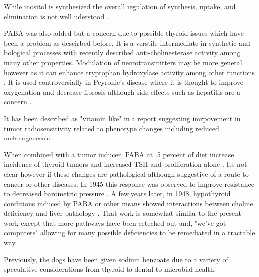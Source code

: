 While inositol is synthesized the overall regulation of synthesis,
uptake, and elimination is not well uderstood
\cite{Su_Ko_Saiardi_Regulations_inositol_2023}.


PABA was also added but a concern due to possible thyroid issues which
have been a problem as descirbed before.
It is a verstile intermediate in synthetic and bological processes
with recently described anti-cholinesterase activity 
\cite{PMC10604881} among many other properties. 
Modulation of neurotransmitters may be more general however
as it can enhance tryptophan hydroxylase activity among
other functions
\cite{Chen_Su_Wu_Molecular_mechanisms_therapeutic_2025}.
It is used controversially in Peyronie's disease where it is thought to
improve oxygenation and decrease fibrosis 
although side effects such as hepatitis are a concern \cite{ROY20082967}.

It has been described as "vitamin like" in a report suggesting
imrpovement in tumor radiosensitivity related to phenotype changes
including reduced melanogeneesis \cite{XAVIER2006517}.

When combined with a  tumor inducer, PABA at .5 percent of diet
increase incidence of thyroid tumors and increased TSH 
and proliferation alone \cite{PMID15843508}. Its not clear
however if these changes are pathological although suggestive
of a route to cancer or other diseases. In 1945 this response
was observed to improve resistance to decreased barometric
pressure
\cite{10.1210/endo-37-4-223}.
A few years later, in 1948, hypothyroid conditions induced by
PABA or other means showed interactions between choline deficiency
and liver pathology \cite{HANDLER1948669}. That work is somewhat
similar to the present work except that more pathways have been
ceteched out and, "we've got computers"  allowing for many possible
deficiencies to be remediated in a tractable way. 


Previously, the dogs have been given sodium benzoate due to a
variety of speculative considerations from thyroid to dental to
microbial health. 


